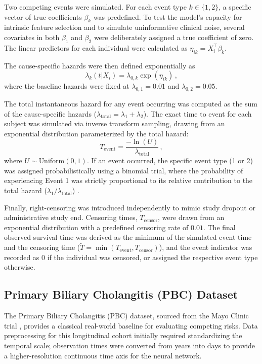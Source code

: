 \documentclass[a4paper,twoside,12pt]{report}
\begin{document}
Two competing events were simulated. For each event type $k \in \{1, 2\}$, a specific vector of true coefficients $\beta_k$ was predefined. To test the model's capacity for intrinsic feature selection and to simulate uninformative clinical noise, several covariates in both $\beta_1$ and $\beta_2$ were deliberately assigned a true coefficient of zero. The linear predictors for each individual were calculated as $\eta_{ik} = X_i^\top \beta_k$.

The cause-specific hazards were then defined exponentially as
$$\lambda_k(t|X_i) = \lambda_{0,k} \exp(\eta_{ik}) \,,$$
where the baseline hazards were fixed at $\lambda_{0,1} = 0.01$ and $\lambda_{0,2} = 0.05$. 

The total instantaneous hazard for any event occurring was computed as the sum of the cause-specific hazards ($\lambda_{\text{total}} = \lambda_1 + \lambda_2$). The exact time to event for each subject was simulated via inverse transform sampling, drawing from an exponential distribution parameterized by the total hazard:
$$T_{\text{event}} = \frac{-\ln(U)}{\lambda_{\text{total}}} \,,$$
where $U \sim \text{Uniform}(0,1)$. If an event occurred, the specific event type (1 or 2) was assigned probabilistically using a binomial trial, where the probability of experiencing Event 1 was strictly proportional to its relative contribution to the total hazard ($\lambda_1 / \lambda_{\text{total}}$) \citep{beyersmann2009simulating}.

Finally, right-censoring was introduced independently to mimic study dropout or administrative study end. Censoring times, $T_{\text{censor}}$, were drawn from an exponential distribution with a predefined censoring rate of $0.01$. The final observed survival time was derived as the minimum of the simulated event time and the censoring time ($\tilde{T} = \min(T_{\text{event}}, T_{\text{censor}})$), and the event indicator was recorded as 0 if the individual was censored, or assigned the respective event type otherwise.

\subsection{Primary Biliary Cholangitis (PBC) Dataset}
The Primary Biliary Cholangitis (PBC) dataset, sourced from the Mayo Clinic trial \cite{fleming1991counting, murtaugh1994primary}, provides a classical real-world baseline for evaluating competing risks. Data preprocessing for this longitudinal cohort initially required standardizing the temporal scale; observation times were converted from years into days to provide a higher-resolution continuous time axis for the neural network. 
\end{document}
